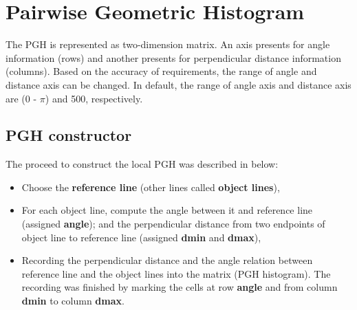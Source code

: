 \section{Pairwise Geometric Histogram}
The PGH is represented as two-dimension matrix. An axis presents for angle information (rows) and another presents for perpendicular distance information (columns). Based on the accuracy of requirements, the range of angle and distance axis can be changed. In default, the range of angle axis and distance axis are ($0$ - $\pi$) and 500, respectively.
\subsection{PGH constructor}
The proceed to construct the local PGH was described in below:
\begin{itemize}
\item Choose the \textbf{reference line} (other lines called \textbf{object lines}),
\item For each object line, compute the angle between it and reference line (assigned \textbf{angle}); and the perpendicular distance from two endpoints of object line to reference line (assigned \textbf{dmin} and \textbf{dmax}),
\item Recording the perpendicular distance and the angle relation between reference line and the object lines into the matrix (PGH histogram). The recording was finished by marking the cells at row \textbf{angle} and from column \textbf{dmin} to column \textbf{dmax}.
\end{itemize}

